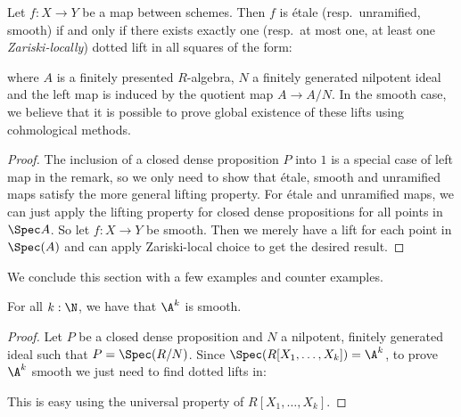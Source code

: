 \begin{remark}
  \label{connection-to-ega-definition}
  Let $f:X\to Y$ be a map between schemes.
  Then $f$ is étale (resp.\ unramified, smooth) if and only if there exists exactly one (resp.\ at most one, at least one \emph{Zariski-locally}) dotted lift in all squares of the form:
  \begin{center}
  \end{center}
where $A$ is a finitely presented $R$-algebra, $N$ a finitely generated nilpotent ideal and the left map is induced by the quotient map $A\to A/N$. In the smooth case, we believe that it is possible to prove global existence of these lifts using cohmological methods.
\end{remark}

\begin{proof}
  The inclusion of a closed dense proposition $P$ into $1$ is a special case of left map in the remark, so we only need to show that étale,
  smooth and unramified maps satisfy the more general lifting property. For étale and unramified maps, we can just apply the lifting property for closed dense propositions for all points in $\Spec A$. So let $f:X\to Y$ be smooth. Then we merely have a lift for each point in $\Spec(A)$ and can apply Zariski-local choice to get the desired result.
\end{proof}

We conclude this section with a few examples and counter examples.

\begin{lemma}\label{An-is-smooth}
For all $k:\N$, we have that $\A^k$ is smooth.
\end{lemma}

\begin{proof}
  Let $P$ be a closed dense proposition and $N$ a nilpotent, finitely generated ideal such that $P=\Spec(R/N)$.
  Since $\Spec(R[X_1,\dots,X_k])=\A^k$, to prove $\A^k$ smooth we just need to find dotted lifts in:
  \begin{center}
  \end{center}
  This is easy using the universal property of $R[X_1,\dots,X_k]$.
\end{proof}

